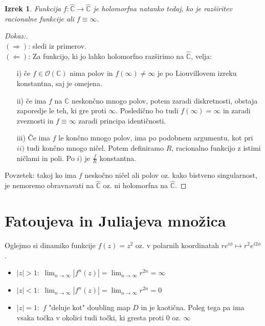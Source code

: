 \documentclass{article}
\newtheorem{izrek}{Izrek}
\newcommand{\C}{\mathbb{C}}
\newcommand{\Ho}{\mathcal{O}}
\begin{document}
\begin{izrek}
Funkcija $f: \hat{\C} \rightarrow \hat{\C}$ je holomorfna natanko tedaj, ko je razširitev racionalne funkcije ali $f \equiv \infty$.
\end{izrek}

\begin{proof}[Dokaz:]
~\\
$(\Longrightarrow)$: sledi iz primerov.\\ 
$(\Longleftarrow)$: 
Za funkcijo, ki jo lahko holomorfno razširimo na $\hat{\C}$, velja:
\begin{enumerate}
\item[i)] če $f\in \Ho(\C)$ nima polov in $f(\infty) \neq \infty$ je po Liouvillovem izreku konstantna, saj je omejena.
\item[ii)] če ima $f$ na $\C$ neskončno mnogo polov, potem zaradi diskretnosti, obstaja zaporedje le teh, ki gre proti $\infty$.
Posledično bo tudi $f(\infty) = \infty$ in zaradi zveznosti in $f \equiv \infty$ zaradi principa identičnosti.
\item[iii)] Če ima $f$ le končno mnogo polov, ima po podobnem argumentu, kot pri $ii)$ tudi končno mnogo ničel. Potem definiramo $R$, racionalno funkcijo z istimi ničlami in poli. 
Po $i)$ je $\frac{f}{R}$ konstantna.
\end{enumerate}
Povzetek: takoj ko ima $f$ neskočno ničel ali polov oz. kako bistveno singularnost, je nemoremo obravnavati na $\hat{\C}$ oz. ni holomorfna na $\hat{\C}$.
\end{proof}

\section{Fatoujeva in Juliajeva množica}

Oglejmo si dinamiko funkcije $f(z) = z^2$ oz. v polarnih 
koordinatah $re^{i\phi} \mapsto r^2 e^{i2\phi}$.
\begin{itemize}
\item $|z| > 1:$ $\lim_{n\rightarrow \infty} |f^n(z)| = \lim_{n\rightarrow \infty} r^{2n} = \infty$
\item $|z| < 1:$ $\lim_{n\rightarrow \infty} |f^n(z)| = \lim_{n\rightarrow \infty} r^{2n} = 0$
\item $|z| = 1:$ $f$ "deluje kot" doubling map $D$ in je kaotična. Poleg tega pa ima vsaka točka v okolici tudi točki, ki gresta proti $0$ oz. $\infty$
\end{itemize}
\end{document}
